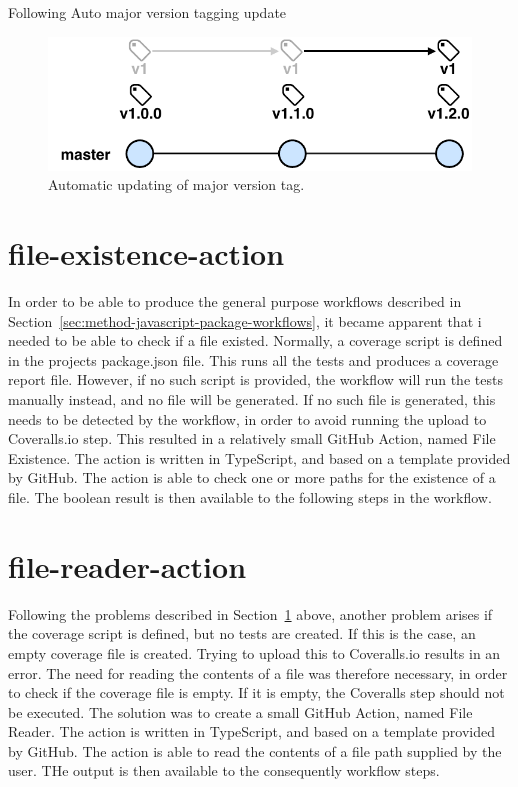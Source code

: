 Following
Auto major version tagging update

\begin{figure}[hp]
    \setlength{\abovecaptionskip}{25pt}
    \centering
    \hspace*{-2cm}\includegraphics[page=1,scale=1]{sections/methodology/figures/update-major-tag.pdf}
    \caption{Automatic updating of major version tag.}
    \label{fig:update-major-tag}
\end{figure}

\section{file-existence-action}
\label{sec:method-file-existence-action}
In order to be able to produce the general purpose workflows described in Section~\ref{sec:method-javascript-package-workflows}, it became apparent that i needed to be able to check if a file existed. Normally, a coverage script is defined in the projects package.json file. This runs all the tests and produces a coverage report file. However, if no such script is provided, the workflow will run the tests manually instead, and no file will be generated. If no such file is generated, this needs to be detected by the workflow, in order to avoid running the upload to Coveralls.io step. This resulted in a relatively small GitHub Action, named File Existence. The action is written in TypeScript, and based on a template provided by GitHub. The action is able to check one or more paths for the existence of a file. The boolean result is then available to the following steps in the workflow.

\section{file-reader-action}
Following the problems described in Section~\ref{sec:method-file-existence-action} above, another problem arises if the coverage script is defined, but no tests are created. If this is the case, an empty coverage file is created. Trying to upload this to Coveralls.io results in an error. The need for reading the contents of a file was therefore necessary, in order to check if the coverage file is empty. If it is empty, the Coveralls step should not be executed. The solution was to create a small GitHub Action, named File Reader. The action is written in TypeScript, and based on a template provided by GitHub. The action is able to read the contents of a file path supplied by the user. THe output is then available to the consequently workflow steps.